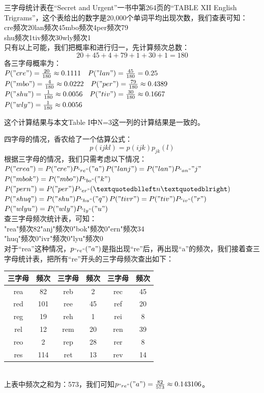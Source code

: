 \documentclass[]{article}
\begin{document}
\vspace{1cm}
三字母统计表在“Secret and Urgent”一书中第264页的“TABLE XII English Trigrams”，这个表给出的数字是20,000个单词平均出现次数，我们查表可知：\\
cre频次20\qquad lan频次45\qquad mbo频次4\qquad per频次79\\
shu频次1\qquad tiv频次30\qquad wly频次1\\
只有以上可能，我们把概率和进行归一，先计算频次总数：
\[20   +   45   +   4   +   79   +   1   +   30   +   1 =180\]
各三字母概率为：\\
$P("cre")=\frac{20}{180}\approx 0.1111\quad P("lan")=\frac{45}{180}=0.25$\\
$P("mbo")=\frac{4}{180}\approx 0.0222\quad P("per")=\frac{79}{180}\approx 0.4389$\\
$P("shu")=\frac{1}{180}\approx 0.0056\quad P("tiv")=\frac{30}{180}\approx 0.1667$\\
$P("wly")=\frac{1}{180}\approx 0.0056$\par
这个计算结果与本文Table I中N=3这一列的计算结果是一致的。

\vspace{1cm}
四字母的情况，香农给了一个估算公式：
\[p(ijkl)=p(ijk)p_{jk}(l)\]
根据三字母的情况，我们只需考虑以下情况：\\
$P("crea")=P("cre")P_{"re"}("a")$\qquad $P("lanj")=P("lan")P_{"an"}{"j"}$\\
$P("mbok")=P("mbo")P_{"bo"}("k")$\qquad $P("pern")=P("per")P_{"er"}(“n”)$\\
$P("shuq")=P("shu")P_{"hu"}("q")$\qquad $P("tivr")=P("tiv")P_{"iv"}("r")$\\
$P("wlyu")=P("wly")P_{"ly"}("u")$\\
查三字母频次统计表，可知：\\
"rea"频次82\qquad "anj"频次0\qquad "bok"频次0\qquad "ern"频次34\\
"huq"频次0\qquad "ivr"频次0\qquad "lyu"频次0\\
对于“rea”这种情况，$p_{"re"}("a")$是指出现“re”后，再出现“a”的频次，我们接着查三字母统计表，把所有“re”开头的三字母频次查出如下：\\
\begin{tabular}{|c|c||c|c||c|c|}
	\hline 
	三字母&频次 & 三字母 & 频次 & 三字母 & 频次 \\ 
	\hline 
	rea& 82 & reb & 2 & rec & 45 \\ 
	\hline 
	red& 101 & ree & 45 & ref & 20 \\ 
	\hline 
	reg& 19 & reh & 1 & rei & 8 \\ 
	\hline 
	rel& 12 & rem & 20 & ren & 39 \\ 
	\hline 
	reo& 2 & rep & 28 & rer & 8 \\ 
	\hline 
	res& 114 & ret & 13 & rev & 14 \\ 
	\hline 	
\end{tabular} 
\\
上表中频次之和为：573，我们可知$p_{"re"}("a")=\frac{82}{573}\approx 0.143106$。
\end{document}
